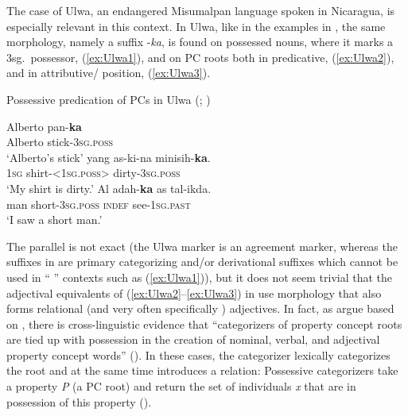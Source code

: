 \documentclass[output=paper,colorlinks,citecolor=brown]{langscibook}
\begin{document}
The case of Ulwa, an endangered Misumalpan language spoken in Nicaragua, is especially relevant in this context. In Ulwa, like in the examples in , the same  morphology, namely a suffix -\textit{ka}, is found on possessed nouns, where it marks a 3sg.\ possessor, (\ref{ex:Ulwa1}), and on PC roots both in predicative, (\ref{ex:Ulwa2}), and in attributive/ position, (\ref{ex:Ulwa3}). 


\begin{exe}
\ex Possessive predication of PCs in Ulwa (\citealt[200]{KoontzFrancez2010}; \citealt[31]{FrancezKoontz2017})
    \begin{xlist}
        \ex \label{ex:Ulwa1} \gll Alberto pan-\textbf{ka}\\
        Alberto stick-\textsc{3sg.poss}\\
       \glt `Alberto's stick'
        \ex \label{ex:Ulwa2} \gll yang as-ki-na minisih-\textbf{ka}.\\
        \textsc{1sg} shirt-<\textsc{1sg.poss}> dirty-\textsc{3sg.poss}\\
\glt `My shirt is dirty.'
\ex \label{ex:Ulwa3} \gll Al adah-\textbf{ka} as tal-ikda.\\
man short-\textsc{3sg.poss} \textsc{indef}  see-\textsc{1sg.past}\\
\glt `I saw a short man.' 
    \end{xlist}
\end{exe}

The parallel is not exact (the Ulwa marker is an agreement marker, whereas the suffixes in  are primary  categorizing and/or derivational suffixes which  cannot be used in `` '' contexts such as (\ref{ex:Ulwa1})), but it does not seem trivial that the adjectival equivalents of (\ref{ex:Ulwa2}--\ref{ex:Ulwa3}) in  use morphology that also forms relational (and very often specifically ) adjectives. In fact, as \citet{HaninkKoontz} argue based on \citet{MenonPancheva}, there is cross-linguistic evidence that ``categorizers of property concept roots are tied up with possession in the creation of nominal, verbal, and adjectival property concept words'' (\citealt[5]{HaninkKoontz}). In these cases, the categorizer lexically categorizes the root and at the same time introduces a  relation: Possessive categorizers take a property \textit{P} (a PC root) and return the set of individuals \textit{x} that are in possession of this property (\citealt[6]{HaninkKoontz}).
\end{document}
